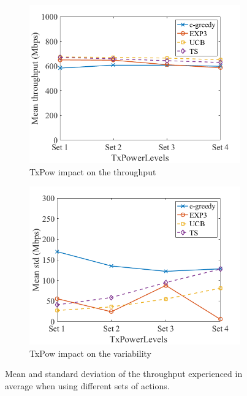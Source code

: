 \documentclass[preprint,12pt]{article}
\begin{document}
\begin{figure}[h!]
\begin{subfigure}[b]{.4\textwidth}
		\includegraphics[width=\textwidth]{images/impact_tx_power_levels_on_throughput}
		\caption{TxPow impact on the throughput}\label{fig:impact_tx_power_levels_on_throughput}
	\end{subfigure}
	\begin{subfigure}[b]{.4\textwidth}
		\includegraphics[width=\textwidth]{images/impact_tx_power_levels_on_variability}
		\caption{TxPow impact on the variability}\label{fig:impact_tx_power_levels_on_variability}
	\end{subfigure}
	\caption{Mean and standard deviation of the throughput experienced in average when using different sets of actions.}
	\label{fig:impact_actions}
\end{figure}
\end{document}
